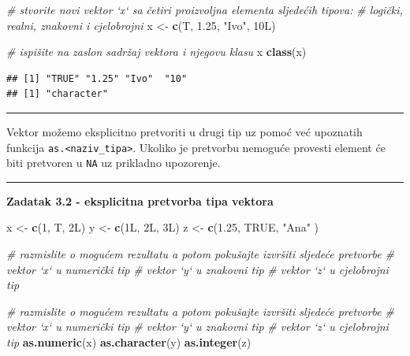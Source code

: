 \documentclass[]{book}
\newenvironment{Shaded}{\begin{snugshade}}{\end{snugshade}}
\newcommand{\KeywordTok}[1]{\textcolor[rgb]{0.13,0.29,0.53}{\textbf{#1}}}
\newcommand{\DecValTok}[1]{\textcolor[rgb]{0.00,0.00,0.81}{#1}}
\newcommand{\FloatTok}[1]{\textcolor[rgb]{0.00,0.00,0.81}{#1}}
\newcommand{\StringTok}[1]{\textcolor[rgb]{0.31,0.60,0.02}{#1}}
\newcommand{\CommentTok}[1]{\textcolor[rgb]{0.56,0.35,0.01}{\textit{#1}}}
\newcommand{\OtherTok}[1]{\textcolor[rgb]{0.56,0.35,0.01}{#1}}
\newcommand{\NormalTok}[1]{#1}
\theoremstyle{definition}
\theoremstyle{definition}
\theoremstyle{definition}
\theoremstyle{remark}
\begin{document}
\begin{Shaded}
\begin{Highlighting}[]
\CommentTok{# stvorite novi vektor `x` sa četiri proizvoljna elementa sljedećih tipova: }
\CommentTok{#  logički, realni, znakovni i cjelobrojni}
\NormalTok{x <-}\StringTok{ }\KeywordTok{c}\NormalTok{(T, }\FloatTok{1.25}\NormalTok{, }\StringTok{"Ivo"}\NormalTok{, 10L)}

\CommentTok{# ispišite na zaslon sadržaj vektora i njegovu klasu}
\NormalTok{x}
\KeywordTok{class}\NormalTok{(x)}
\end{Highlighting}
\end{Shaded}

\begin{verbatim}
## [1] "TRUE" "1.25" "Ivo"  "10"  
## [1] "character"
\end{verbatim}

\begin{center}\rule{0.5\linewidth}{\linethickness}\end{center}

Vektor možemo eksplicitno pretvoriti u drugi tip uz pomoć već upoznatih
funkcija \texttt{as.\textless{}naziv\_tipa\textgreater{}}. Ukoliko je
pretvorbu nemoguće provesti element će biti pretvoren u \texttt{NA} uz
prikladno upozorenje.

\begin{center}\rule{0.5\linewidth}{\linethickness}\end{center}

\textbf{Zadatak 3.2 - eksplicitna pretvorba tipa vektora}

\begin{Shaded}
\begin{Highlighting}[]
\NormalTok{x <-}\StringTok{ }\KeywordTok{c}\NormalTok{(}\DecValTok{1}\NormalTok{, T, 2L)}
\NormalTok{y <-}\StringTok{ }\KeywordTok{c}\NormalTok{(1L, 2L, 3L)}
\NormalTok{z <-}\StringTok{ }\KeywordTok{c}\NormalTok{(}\FloatTok{1.25}\NormalTok{, }\OtherTok{TRUE}\NormalTok{, }\StringTok{"Ana"}\NormalTok{ )}

\CommentTok{# razmislite o mogućem rezultatu a potom pokušajte izvršiti sljedeće pretvorbe}
\CommentTok{# vektor `x` u numerički tip}
\CommentTok{# vektor `y` u znakovni tip}
\CommentTok{# vektor `z` u cjelobrojni tip}
\end{Highlighting}
\end{Shaded}

\begin{Shaded}
\begin{Highlighting}[]
\CommentTok{# razmislite o mogućem rezultatu a potom pokušajte izvršiti sljedeće pretvorbe}
\CommentTok{# vektor `x` u numerički tip}
\CommentTok{# vektor `y` u znakovni tip}
\CommentTok{# vektor `z` u cjelobrojni tip}
\KeywordTok{as.numeric}\NormalTok{(x)}
\KeywordTok{as.character}\NormalTok{(y)}
\KeywordTok{as.integer}\NormalTok{(z)}
\end{Highlighting}
\end{Shaded}
\end{document}
